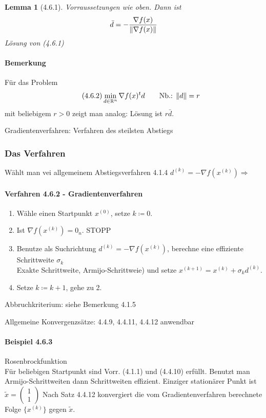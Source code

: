 \documentclass[ngerman,halfparskip]{scrartcl}
\DeclarePairedDelimiter{\norm}{\lVert}{\rVert}
\newtheorem*{lemma}{Lemma}
\theoremstyle{definition}
\newcommand*{\R}{\mathbb{R}}      %
\begin{document}
\begin{lemma}[4.6.1]
Vorraussetzungen wie oben. Dann ist 
$$\bar d = - \frac {\nabla f(x)}{\norm{\nabla f(x)}}$$
Lösung von (4.6.1)
\end{lemma}
\paragraph{Bemerkung} Für das Problem
\begin{gather*}\tag{4.6.2}
\min\limits_{d\in\R^n}\nabla f(x)^td \qquad \text{Nb.: }\norm{d}=r
\end{gather*}
mit beliebigem $r>0$ zeigt man analog: Lösung ist $r\bar d$.

Gradientenverfahren: Verfahren des steilsten Abstiegs

\subsubsection{Das Verfahren}
Wählt man vei allgemeinem Abstiegsverfahren 4.1.4 $d^{(k)}=-\nabla f(x^{(k)}) \Rightarrow$
\paragraph{Verfahren 4.6.2 - Gradientenverfahren} 
\begin{enumerate}
\item Wähle einen Startpunkt $x^{(0)}$, setze $k\coloneqq 0$.
\item Ist $\nabla f (x^{(k)})=0_n$. STOPP
\item Benutze als Suchrichtung $d^{(k)}=-\nabla f(x^{(k)})$, berechne eine effiziente Schrittweite $\sigma_k$\\
Exakte Schrittweite, Armijo-Schrittweie) und setze $x^{(k+1)}=x^{(k)}+\sigma_k d^{(k)}$.
\item Setze $k\coloneqq k+1$, gehe zu 2.
\end{enumerate}

Abbruchkriterium: siehe Bemerkung 4.1.5

Allgemeine Konvergenzsätze: 4.4.9, 4.4.11, 4.4.12 anwendbar

\paragraph{Beispiel 4.6.3} Rosenbrockfunktion\\
Für beliebigen Startpunkt sind Vorr. (4.1.1) und (4.4.10) erfüllt. Benutzt man Armijo-Schrittweiten dann Schrittweiten effizient. Einziger stationärer Punkt ist $\tilde x = \begin{pmatrix}
1\\1
\end{pmatrix}
$ Nach Satz 4.4.12 konvergiert die vom Gradientenverfahren berechnete Folge $\{x^{(k)}\}$ gegen $\tilde x$.
\end{document}
